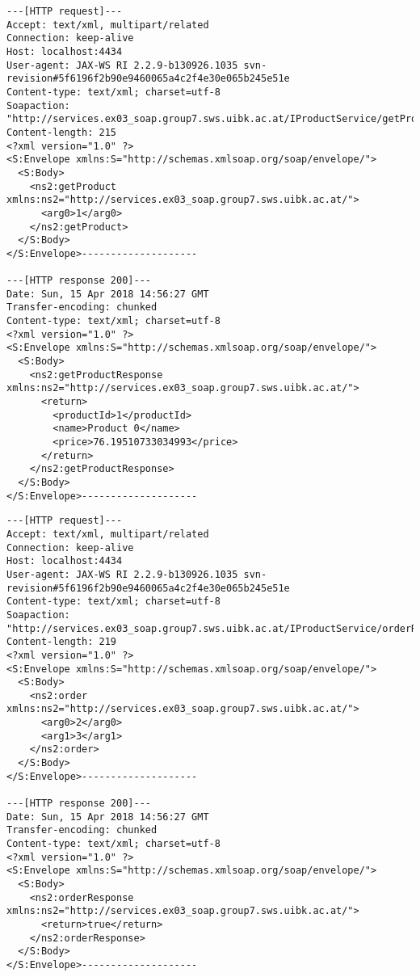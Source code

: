 \documentclass[a4paper]{article}
\begin{document}
\begin{lstlisting}[caption=Request \& Response for \emph{getProduct()}]
---[HTTP request]---
Accept: text/xml, multipart/related
Connection: keep-alive
Host: localhost:4434
User-agent: JAX-WS RI 2.2.9-b130926.1035 svn-revision#5f6196f2b90e9460065a4c2f4e30e065b245e51e
Content-type: text/xml; charset=utf-8
Soapaction: "http://services.ex03_soap.group7.sws.uibk.ac.at/IProductService/getProductRequest"
Content-length: 215
<?xml version="1.0" ?>
<S:Envelope xmlns:S="http://schemas.xmlsoap.org/soap/envelope/">
  <S:Body>
    <ns2:getProduct xmlns:ns2="http://services.ex03_soap.group7.sws.uibk.ac.at/">
      <arg0>1</arg0>
    </ns2:getProduct>
  </S:Body>
</S:Envelope>--------------------

---[HTTP response 200]---
Date: Sun, 15 Apr 2018 14:56:27 GMT
Transfer-encoding: chunked
Content-type: text/xml; charset=utf-8
<?xml version="1.0" ?>
<S:Envelope xmlns:S="http://schemas.xmlsoap.org/soap/envelope/">
  <S:Body>
    <ns2:getProductResponse xmlns:ns2="http://services.ex03_soap.group7.sws.uibk.ac.at/">
      <return>
        <productId>1</productId>
        <name>Product 0</name>
        <price>76.19510733034993</price>
      </return>
    </ns2:getProductResponse>
  </S:Body>
</S:Envelope>--------------------
\end{lstlisting}\vspace{0.5cm}

\begin{lstlisting}[caption=Request \& Response for \emph{order()}]
---[HTTP request]---
Accept: text/xml, multipart/related
Connection: keep-alive
Host: localhost:4434
User-agent: JAX-WS RI 2.2.9-b130926.1035 svn-revision#5f6196f2b90e9460065a4c2f4e30e065b245e51e
Content-type: text/xml; charset=utf-8
Soapaction: "http://services.ex03_soap.group7.sws.uibk.ac.at/IProductService/orderRequest"
Content-length: 219
<?xml version="1.0" ?>
<S:Envelope xmlns:S="http://schemas.xmlsoap.org/soap/envelope/">
  <S:Body>
    <ns2:order xmlns:ns2="http://services.ex03_soap.group7.sws.uibk.ac.at/">
      <arg0>2</arg0>
      <arg1>3</arg1>
    </ns2:order>
  </S:Body>
</S:Envelope>--------------------

---[HTTP response 200]---
Date: Sun, 15 Apr 2018 14:56:27 GMT
Transfer-encoding: chunked
Content-type: text/xml; charset=utf-8
<?xml version="1.0" ?>
<S:Envelope xmlns:S="http://schemas.xmlsoap.org/soap/envelope/">
  <S:Body>
    <ns2:orderResponse xmlns:ns2="http://services.ex03_soap.group7.sws.uibk.ac.at/">
      <return>true</return>
    </ns2:orderResponse>
  </S:Body>
</S:Envelope>--------------------
\end{lstlisting}\vspace{0.5cm}
\end{document}
